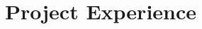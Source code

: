 \documentclass[letterpaper,11pt]{article}
\newenvironment{extra}{}{}
\begin{document}
\begin{itemize}

\end{itemize}


\section{Project Experience}
\end{document}
